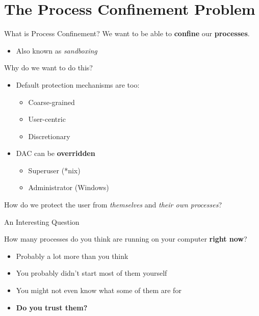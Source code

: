 \documentclass[12pt, dvipsnames, aspectratio=169]{beamer}
\begin{document}
\section{The Process Confinement Problem}

\begin{frame}[c]{What is Process Confinement?}
We want to be able to \textbf{confine} our \textbf{processes}.
\begin{itemize}
    \item Also known as \textit{sandboxing}
\end{itemize}
\vfill
Why do we want to do this?
\begin{itemize}
    \item Default protection mechanisms are too:
    \begin{itemize}
        \item Coarse-grained
        \item User-centric
        \item Discretionary
    \end{itemize}
    \item DAC can be \textbf{overridden}
    \begin{itemize}
        \item Superuser (*nix)
        \item Administrator (Windows)
    \end{itemize}
\end{itemize}
\vfill
How do we protect the user from \textit{themselves} and \textit{their own processes}?
\end{frame}

\begin{frame}[c]{An Interesting Question}
\begin{center}
    \Huge
    How many processes do you think are running on your computer \textbf{right now}?
\end{center}
\vfill
\begin{itemize}
    \item Probably a lot more than you think
    \item You probably didn't start most of them yourself
    \item You might not even know what some of them are for
    \item \textbf{Do you trust them?}
\end{itemize}
\end{frame}
\end{document}
